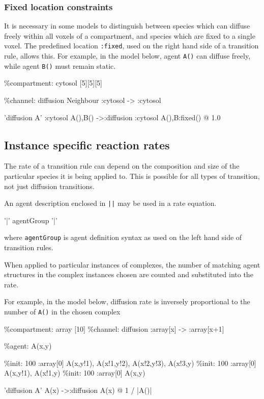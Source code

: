 \documentclass[english]{report}
\begin{document}
\subsubsection{Fixed location constraints}

It is necessary in some models to distinguish between species which can diffuse freely within all voxels of a compartment, and species which are fixed to a single voxel. The predefined location \verb|:fixed|, used on the right hand side of a transition rule, allows this. For example, in the model below, agent \verb|A()| can diffuse freely, while agent \verb|B()| must remain static. 

\begin{kappasource}
\%compartment: cytosol [5][5][5]

\%channel: diffusion Neighbour :cytosol -> :cytosol

'diffusion A' :cytosol A(),B() ->:diffusion :cytosol A(),B:fixed() @ 1.0
\end{kappasource}


\subsection{Instance specific reaction rates}

The rate of a transition rule can depend on the composition and size of the particular species it is being applied to. This is possible for all types of transition, not just diffusion transitions.  

An agent description enclosed in \Verb+||+ may be used in a rate equation.

\begin{bnfsource}
'|' agentGroup '|'
\end{bnfsource}

where \verb|agentGroup| is agent definition syntax as used on the left hand side of transition rules.

When applied to particular instances of complexes, the number of matching agent structures in the complex instances chosen are counted and substituted into the rate.

For example, in the model below, diffusion rate is inversely proportional to the number of \verb|A()| in the chosen complex

\begin{kappasource}
\%compartment: array [10]
\%channel: diffusion :array[x] -> :array[x+1]

\%agent: A(x,y)

\%init: 100 :array[0] A(x,y!1), A(x!1,y!2), A(x!2,y!3), A(x!3,y)
\%init: 100 :array[0] A(x,y!1), A(x!1,y)
\%init: 100 :array[0] A(x,y)

'diffusion A' A(x) ->:diffusion A(x) @ 1 / |A()|
\end{kappasource}
\end{document}
